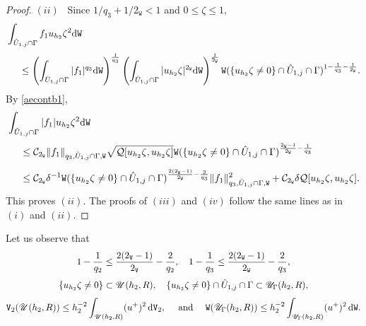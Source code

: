 \documentclass[reqno, 11pt, a4paper]{amsart}
\numberwithin{equation}{section}
\newcommand{\ops}{\mathcal{Q}}
\newcommand{\xv}{2_{\mathtt{V}}}
\newcommand{\xw}{2_{\mathtt{W}}}
\newcommand{\wghtv}{\mathtt{V}}
\newcommand{\wghtw}{\mathtt{W}}
\newcommand{\dwv}{\textnormal{d} \mathtt{V}}
\newcommand{\dww}{\textnormal{d} \mathtt{W}}
\begin{document}
\begin{proof}
\noindent $(ii)$ \ Since      $1/q_3 + 1/\xw < 1$  and  $0\leq \zeta \leq 1$,
\begin{align*}
& \int _{\hat U _{1,j} \cap \Gamma }  f_1 u_{h_{2}}  \zeta ^2  \dww    \\[3pt]
& \quad \  \leq   \left( \int _{\hat U _{1,j} \cap \Gamma }  |f_1| ^{q_3}  \dww   \right) ^{\frac{1}{q_3}} \left( \int _{\hat U _{1,j} \cap \Gamma }   | u_{h_{2}}  \zeta |^ {\xw}  \dww    \right) ^{ \frac{1}{\xw} }  \wghtw  (\{ u_{h_{2}}  \zeta \neq 0\}\cap \hat U _{1,j} \cap \Gamma ) ^ {1- \frac{1}{q_3} - \frac{1}{\xw}}.
\end{align*}
By \eqref{aecontb1},
\begin{align*}
&\int _{\hat U _{1,j} \cap \Gamma }  |f_1| u_{h_{2}}  \zeta ^2   \dww    \\[3pt]
& \quad \ \leq  \mathcal C_{\xw} \Vert f_1 \Vert _{q_3 , \hat U _{1,j} \cap \Gamma , \wghtw }  \sqrt{\ops [ u_{h_{2}}  \zeta , u_{h_{2}}  \zeta ]}   \wghtw  (\{ u_{h_{2}}  \zeta \neq 0\}\cap \hat U _{1,j} \cap \Gamma ) ^ {\frac{\xw -1 }{\xw} - \frac{1}{q_3}} \\[5pt]
&\quad \ \leq  \mathcal C_{\xw} \delta ^{-1} \wghtw  ( \{ u_{h_{2}}  \zeta \neq 0\}\cap \hat U _{1,j} \cap \Gamma ) ^ {\frac{2(\xw -1)}{\xw} - \frac{2}{q_3}}  \Vert f_1 \Vert _{q_3 , \hat U _{1,j} \cap \Gamma , \wghtw} ^2  +  \mathcal C_{\xw} \delta \ops [ u_{h_{2}}  \zeta , u_{h_{2}}  \zeta ].
\end{align*}
This proves $(ii)$. The proofs of $(iii)$ and $(iv)$ follow the same lines as in $(i)$ and $(ii)$. \end{proof}

Let us observe that  
\begin{gather*}
1- \frac{ 1}{q_2} \leq \frac{2(\xv -1) }{ \xv} - \frac{2}{q_2}, \quad   1- \frac{1}{q_3} \leq \frac{2(\xw -1) }{ \xw} - \frac{2}{q_3},\\[3pt]  
\{u_{h_{2}}  \zeta  \neq 0\} \subset \mathscr{U}(h_{2},R),  \quad \{u_{h_{2}}  \zeta  \neq 0\} \cap \hat U _{1,j} \cap \Gamma \subset \mathscr{U} _{\Gamma }  (h_{2},R),\\[3pt]
  \wghtv _{2} (\mathscr{U} (h_{2},R) ) \leq h_{2}^{-2} \int _{\mathscr{U} (h_{2},R)} (u^+)^2 \, \dwv _{2} , \quad   \text {  and  } \quad \wghtw ( \mathscr{U} _{\Gamma }  (h_{2},R) ) \leq h_{2}^{-2} \int _{\mathscr{U} _{\Gamma } (h_{2},R)} (u^+)^2  \, \dww  .
  \end{gather*} 
\end{document}

